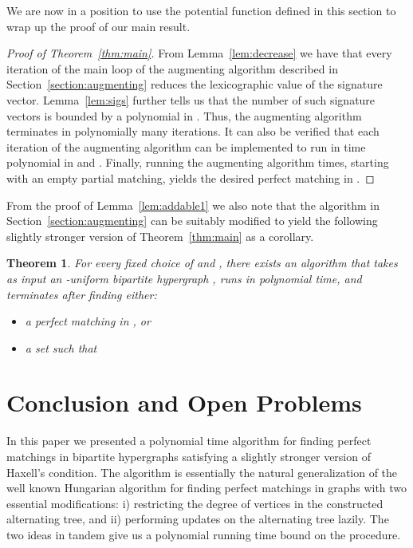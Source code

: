 \documentclass[11pt]{article}
\newtheorem{theorem}{Theorem}[section]
\theoremstyle{definition}
\theoremstyle{remark}
\begin{document}
We are now in a position to use the potential function defined in this
section to wrap up the proof of our main result.

\begin{proof}[Proof of Theorem~\ref{thm:main}]
  From Lemma~\ref{lem:decrease} we have that every iteration of the main loop of the augmenting algorithm described in Section~\ref{section:augmenting} reduces the lexicographic value of the signature vector. Lemma~\ref{lem:sigs} further tells us that the number of such signature vectors is bounded by a polynomial in . Thus, the augmenting algorithm terminates in polynomially many iterations. It can also be verified that each iteration of the augmenting algorithm can be implemented to run in time polynomial in  and . Finally, running the augmenting algorithm  times, starting with an empty partial matching, yields the desired perfect matching in .  \end{proof}

 
From the proof of Lemma~\ref{lem:addable1} we also note that the
algorithm in Section~\ref{section:augmenting} can be suitably modified
to yield the following
slightly stronger version of Theorem~\ref{thm:main} as a corollary.
\begin{theorem}\label{thm:maincorollary}
  For every fixed choice of  and , there exists
  an algorithm  that takes as input an
  -uniform bipartite hypergraph , runs in polynomial
  time, and terminates after finding either:
  \begin{itemize}
  \item a perfect matching in , or
  \item a set  such that 
  \end{itemize}
\end{theorem}

\section{Conclusion and Open Problems}
In this paper we presented a polynomial time algorithm for finding
perfect matchings in bipartite hypergraphs satisfying a slightly
stronger version of Haxell's condition. The algorithm is essentially
the natural generalization of the well known Hungarian algorithm for
finding perfect matchings in graphs with two essential modifications:
i) restricting the degree of vertices in the constructed alternating
tree, and ii) performing updates on the alternating tree lazily. The
two ideas in tandem give us a polynomial running time bound on the
procedure.
\end{document}
